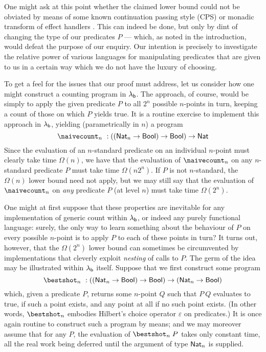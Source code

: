 \documentclass[12pt,phd,lfcs,twoside,openright,logo,leftchapter,normalheadings]{infthesis}
\theoremstyle{plain}
\theoremstyle{definition}
\begin{document}
One might ask at this point whether the claimed lower bound could not
be obviated by means of some known continuation passing style (CPS) or
monadic transform of effect handlers
\cite{HillerstromLAS17,Leijen17}. This can indeed be done, but only by
dint of changing the type of our predicates $P$ --- which, as noted in
the introduction, would defeat the purpose of our enquiry.
Our intention is precisely to investigate the relative power of various
languages for manipulating predicates that are given to us in a
certain way which we do not have the luxury of choosing.

To get a feel for the issues that our proof must address, let us
consider how one might construct a counting program in
$\lambda_{\mathsf{b}}$.  The \naive approach, of course, would be simply to apply the
given predicate $P$ to all $2^n$ possible $n$-points in turn, keeping
a count of those on which $P$ yields true.  It is a routine exercise to
implement this approach in $\lambda_{\mathsf{b}}$, yielding (parametrically in $n$)
a program
%
{\small
\[
  \naivecount_n ~: ((\Nat_n \to \Bool) \to \Bool) \to \Nat
\]}%
%
Since the evaluation of an $n$-standard predicate on an individual
$n$-point must clearly take time $\Omega(n)$, we have that the
evaluation of $\naivecount_n$ on any $n$-standard predicate $P$ must
take time $\Omega(n2^n)$. If $P$ is not $n$-standard, the $\Omega(n)$
lower bound need not apply, but we may still say that the evaluation
of $\naivecount_n$ on \emph{any} predicate $P$ (at level $n$) must
take time $\Omega(2^n)$.

One might at first suppose that these properties are inevitable for
any implementation of generic count within $\lambda_{\mathsf{b}}$, or indeed any
purely functional language: surely, the only way to learn something
about the behaviour of $P$ on every possible $n$-point is to apply $P$
to each of these points in turn?  It turns out, however, that the
$\Omega(2^n)$ lower bound can sometimes be circumvented by
implementations that cleverly exploit \emph{nesting} of calls to $P$.
%
The germ of the idea may be illustrated within $\lambda_{\mathsf{b}}$ itself.
Suppose that we first construct some program
%
{\small
\[
  \bestshot_n ~: ((\Nat_n \to \Bool) \to \Bool) \to (\Nat_n \to \Bool)
\]}%
%
which, given a predicate $P$, returns some $n$-point $Q$ such that
$P~Q$ evaluates to true, if such a point exists, and any point at all
if no such point exists.
%
(In other words, $\bestshot_n$ embodies Hilbert's choice operator
$\varepsilon$ on predicates.)
%
It is once again routine to construct such a program by \naive means;
and we may moreover assume that for any $P$, the evaluation of
$\bestshot_n\;P$ takes only constant time, all the real work being
deferred until the argument of type $\mathsf{Nat}_n$ is supplied.
\end{document}
